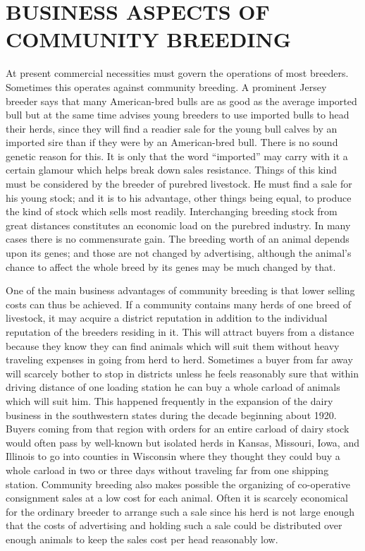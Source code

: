 \section*{BUSINESS ASPECTS OF COMMUNITY BREEDING}

At present commercial necessities must govern the operations of
most breeders. Sometimes this operates against community breeding. A
prominent Jersey breeder says that many American-bred bulls are as
good as the average imported bull but at the same time advises young
breeders to use imported bulls to head their herds, since they will find a
readier sale for the young bull calves by an imported sire than if they
were by an American-bred bull. There is no sound genetic reason for
this. It is only that the word ``imported'' may carry with it a certain
glamour which helps break down sales resistance. Things of this kind
must be considered by the breeder of purebred livestock. He must find a
sale for his young stock; and it is to his advantage, other things being
equal, to produce the kind of stock which sells most readily. Interchanging
breeding stock from great distances constitutes an economic load on
the purebred industry. In many cases there is no commensurate gain.
The breeding worth of an animal depends upon its genes; and those are
not changed by advertising, although the animal's chance to affect the
whole breed by its genes may be much changed by that.

One of the main business advantages of community breeding is that
lower selling costs can thus be achieved. If a community contains many
herds of one breed of livestock, it may acquire a district reputation in
addition to the individual reputation of the breeders residing in it.
This will attract buyers from a distance because they know they can find
animals which will suit them without heavy traveling expenses in going
from herd to herd. Sometimes a buyer from far away will scarcely bother
to stop in districts unless he feels reasonably sure that within driving
distance of one loading station he can buy a whole carload of animals
which will suit him. This happened frequently in the expansion of the
dairy business in the southwestern states during the decade beginning
about 1920. Buyers coming from that region with orders for an entire
carload of dairy stock would often pass by well-known but isolated
herds in Kansas, Missouri, Iowa, and Illinois to go into counties in Wisconsin
where they thought they could buy a whole carload in two or
three days without traveling far from one shipping station. Community
breeding also makes possible the organizing of co-operative consignment
sales at a low cost for each animal. Often it is scarcely economical
for the ordinary breeder to arrange such a sale since his herd is not
large enough that the costs of advertising and holding such a sale could
be distributed over enough animals to keep the sales cost per head reasonably
low.

